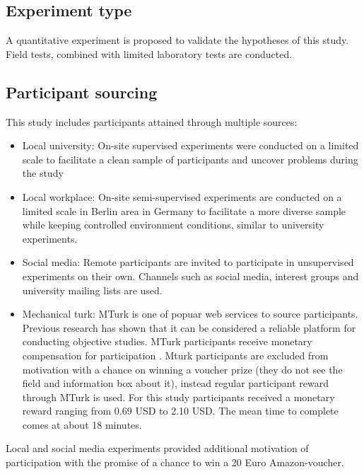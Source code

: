 \subsection{Experiment type} A quantitative experiment is proposed to validate the hypotheses of this study. Field tests, combined with limited laboratory tests are conducted.

\subsection{Participant sourcing} 
This study includes participants attained through multiple sources:
\begin{itemize}
	\item{Local university:} On-site supervised experiments were conducted on a limited scale to facilitate a clean sample of participants and uncover problems during the study
	
	\item{Local workplace:} On-site semi-supervised experiments are conducted on a limited scale in Berlin area in Germany to facilitate a more diverse sample while keeping controlled environment conditions, similar to university experiments.
	
	\item{Social media:} Remote participants are invited to participate in unsupervised experiments on their own. Channels such as social media, interest groups and university mailing lists are used.
	
	\item{Mechanical turk:} MTurk is one of popuar web services to source participants. Previous research has shown that it can be considered a reliable platform for conducting objective studies. MTurk participants receive monetary compensation for participation \cite{Buhrmester2011a}. Mturk participants are excluded from motivation with a chance on winning a voucher prize (they do not see the field and information box about it), instead regular participant reward through MTurk is used. For this study participants received a monetary reward ranging from 0.69 USD to 2.10 USD. The mean time to complete comes at about 18 minutes.
	
\end{itemize}

Local and social media experiments provided additional motivation of participation with the promise of a chance to win a 20 Euro Amazon-voucher.